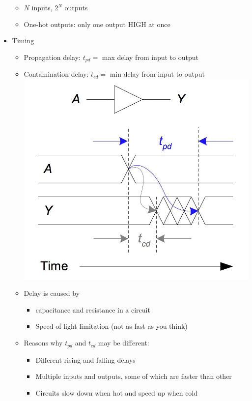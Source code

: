 \documentclass[a4paper]{article}
\begin{document}
\begin{itemize}
\begin{itemize}
\item $N$ inputs, $2^N$ outputs
\item One-hot outputs: only one output HIGH at once
\end{itemize}
\item Timing
\begin{itemize}
\item Propagation delay: $t_{pd}=$ max delay from input to output
\item Contamination delay: $t_{cd}=$ min delay from input to output\\
\includegraphics[scale=0.3]{Figures/PropContDelay.jpg}
\item Delay is caused by 
\begin{itemize}
\item capacitance and resistance in a circuit
\item Speed of light limitation (not as fast as you think)
\end{itemize}
\item Reasons why $t_{pd}$ and $t_{cd}$ may be different:
\begin{itemize}
\item Different rising and falling delays
\item Multiple inputs and outputs, some of which are faster than other
\item Circuits slow down when hot and speed up when cold
\end{itemize}

\end{itemize}
\end{itemize}
\end{document}
